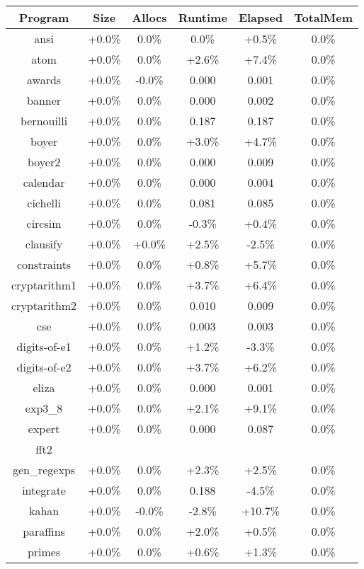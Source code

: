 \begin{tabular}{ c c c c c c }
Program & Size & Allocs & Runtime & Elapsed & TotalMem\\
\hline
ansi & +0.0\% &  0.0\% &  0.0\% & +0.5\% &  0.0\%\\
atom & +0.0\% &  0.0\% & +2.6\% & +7.4\% &  0.0\%\\
awards & +0.0\% & -0.0\% & 0.000 & 0.001 &  0.0\%\\
banner & +0.0\% &  0.0\% & 0.000 & 0.002 &  0.0\%\\
bernouilli & +0.0\% &  0.0\% & 0.187 & 0.187 &  0.0\%\\
boyer & +0.0\% &  0.0\% & +3.0\% & +4.7\% &  0.0\%\\
boyer2 & +0.0\% &  0.0\% & 0.000 & 0.009 &  0.0\%\\
calendar & +0.0\% &  0.0\% & 0.000 & 0.004 &  0.0\%\\
cichelli & +0.0\% &  0.0\% & 0.081 & 0.085 &  0.0\%\\
circsim & +0.0\% &  0.0\% & -0.3\% & +0.4\% &  0.0\%\\
clausify & +0.0\% & +0.0\% & +2.5\% & -2.5\% &  0.0\%\\
constraints & +0.0\% &  0.0\% & +0.8\% & +5.7\% &  0.0\%\\
cryptarithm1 & +0.0\% &  0.0\% & +3.7\% & +6.4\% &  0.0\%\\
cryptarithm2 & +0.0\% &  0.0\% & 0.010 & 0.009 &  0.0\%\\
cse & +0.0\% &  0.0\% & 0.003 & 0.003 &  0.0\%\\
digits-of-e1 & +0.0\% &  0.0\% & +1.2\% & -3.3\% &  0.0\%\\
digits-of-e2 & +0.0\% &  0.0\% & +3.7\% & +6.2\% &  0.0\%\\
eliza & +0.0\% &  0.0\% & 0.000 & 0.001 &  0.0\%\\
exp3\_8 & +0.0\% &  0.0\% & +2.1\% & +9.1\% &  0.0\%\\
expert & +0.0\% &  0.0\% & 0.000 & 0.087 &  0.0\%\\
fft2 &  &  &  &  & \\
gen\_regexps & +0.0\% &  0.0\% & +2.3\% & +2.5\% &  0.0\%\\
integrate & +0.0\% &  0.0\% & 0.188 & -4.5\% &  0.0\%\\
kahan & +0.0\% & -0.0\% & -2.8\% & +10.7\% &  0.0\%\\
paraffins & +0.0\% &  0.0\% & +2.0\% & +0.5\% &  0.0\%\\
primes & +0.0\% &  0.0\% & +0.6\% & +1.3\% &  0.0\%\\

\end{tabular}
